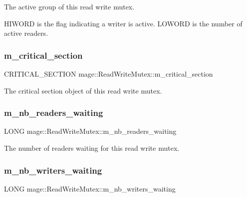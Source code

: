 The active group of this read write mutex.

{\ttfamily H\+I\+W\+O\+RD} is the flag indicating a writer is active. {\ttfamily L\+O\+W\+O\+RD} is the number of active readers. \hypertarget{classmage_1_1_read_write_mutex_a77fe51b87e5205d60ea045fa53bc1fa3}{}\label{classmage_1_1_read_write_mutex_a77fe51b87e5205d60ea045fa53bc1fa3} 
\subsubsection{\texorpdfstring{m\+\_\+critical\+\_\+section}{m\_critical\_section}}
{\footnotesize\ttfamily C\+R\+I\+T\+I\+C\+A\+L\+\_\+\+S\+E\+C\+T\+I\+ON mage\+::\+Read\+Write\+Mutex\+::m\+\_\+critical\+\_\+section\hspace{0.3cm}{\ttfamily [private]}}

The critical section object of this read write mutex. \hypertarget{classmage_1_1_read_write_mutex_acbe7553fff7cca2656f6f2b8f0471484}{}\label{classmage_1_1_read_write_mutex_acbe7553fff7cca2656f6f2b8f0471484} 
\subsubsection{\texorpdfstring{m\+\_\+nb\+\_\+readers\+\_\+waiting}{m\_nb\_readers\_waiting}}
{\footnotesize\ttfamily L\+O\+NG mage\+::\+Read\+Write\+Mutex\+::m\+\_\+nb\+\_\+readers\+\_\+waiting\hspace{0.3cm}{\ttfamily [private]}}

The number of readers waiting for this read write mutex. \hypertarget{classmage_1_1_read_write_mutex_a003313794a9b43f80bd9b258b039438d}{}\label{classmage_1_1_read_write_mutex_a003313794a9b43f80bd9b258b039438d} 
\subsubsection{\texorpdfstring{m\+\_\+nb\+\_\+writers\+\_\+waiting}{m\_nb\_writers\_waiting}}
{\footnotesize\ttfamily L\+O\+NG mage\+::\+Read\+Write\+Mutex\+::m\+\_\+nb\+\_\+writers\+\_\+waiting\hspace{0.3cm}{\ttfamily [private]}}

